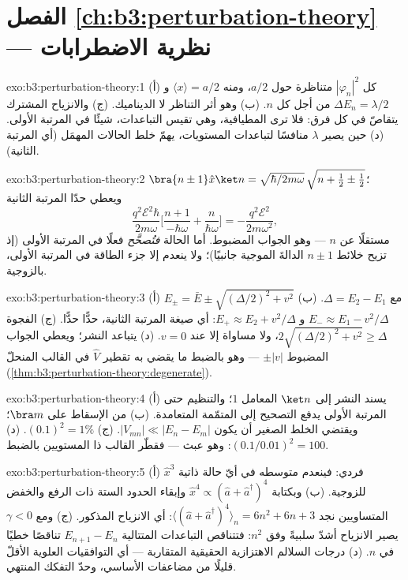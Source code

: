 \section*{الفصل \ref{ch:b3:perturbation-theory} --- نظرية الاضطرابات}

\begin{solution}{exo:b3:perturbation-theory:1}
(أ) كل $|\varphi_n|^2$ متناظرة حول $a/2$، ومنه $\langle
x\rangle = a/2$ و $\Delta E_n = \lambda/2$ من أجل كل $n$. (ب) وهو
أثر التناظر لا الديناميك. (ج) والانزياح المشترك يتقاصّ في كل
فرق: فلا ترى المطيافية، وهي تقيس التباعدات، شيئًا في
المرتبة الأولى. (د) حين يصير $\lambda$ منافسًا لتباعدات المستويات،
يهمّ خلط الحالات المهمَل (أي المرتبة الثانية).
\end{solution}

\begin{solution}{exo:b3:perturbation-theory:2}
$\bra{n\pm1}\hat x\ket n = \sqrt{\hbar/2m\omega}\,\sqrt{n + \tfrac12
\pm \tfrac12}$؛ ويعطي حدّا المرتبة الثانية
\[
\frac{q^2\mathcal E^2\hbar}{2m\omega}\Big[\frac{n+1}{-\hbar\omega}
+ \frac{n}{\hbar\omega}\Big] = -\frac{q^2\mathcal E^2}{2m\omega^2} ,
\]
مستقلًا عن $n$ --- وهو الجواب المضبوط. أما الحالة \emph{فتُصحَّح}
فعلًا في المرتبة الأولى (إذ تزيح خلائط $n \pm 1$ الدالةَ
الموجية جانبيًا)؛ ولا ينعدم إلا جزء الطاقة في المرتبة الأولى،
بالزوجية.
\end{solution}

\begin{solution}{exo:b3:perturbation-theory:3}
(أ) $E_\pm = \bar E \pm \sqrt{(\Delta/2)^2 + v^2}$ مع $\Delta =
E_2 - E_1$. (ب) $E_- \approx E_1 - v^2/\Delta$ و $E_+ \approx E_2 +
v^2/\Delta$: أي صيغة المرتبة الثانية، حدًّا حدًّا. (ج) الفجوة
$2\sqrt{(\Delta/2)^2 + v^2} \ge \Delta$، ولا مساواة إلا عند $v =
0$. (د) يتباعد النشر؛ ويعطي الجواب المضبوط $\pm|v|$ ---
وهو بالضبط ما يقضي به تقطير $\hat V$ في القالب المنحلّ
(\cref{thm:b3:perturbation-theory:degenerate}).
\end{solution}

\begin{solution}{exo:b3:perturbation-theory:4}
(أ) يسند النشر إلى $\ket n$ المعامل $1$؛ والتنظيم
حتى المرتبة الأولى يدفع التصحيح إلى المتمّمة
المتعامدة. (ب) من الإسقاط على $\bra m$؛ ويقتضي الخلط الصغير
أن يكون $|V_{mn}| \ll |E_n - E_m|$. (ج) $(0.1)^2 = 1\%$. (د)
$(0.1/0.01)^2 = 100$: وهو عبث --- فقطّر القالب ذا المستويين
بالضبط.
\end{solution}

\begin{solution}{exo:b3:perturbation-theory:5}
(أ) $\hat x^3$ فردي: فينعدم متوسطه في أيّ حالة ذاتية للزوجية.
(ب) وبكتابة $\hat x^4 \propto (\hat a + \hat
a^\dagger)^4$ وإبقاء الحدود الستة ذات الرفع والخفض
المتساويين نجد $\langle(\hat a + \hat a^\dagger)^4\rangle_n = 6n^2
+ 6n + 3$: أي الانزياح المذكور. (ج) ومع $\gamma < 0$ يصير الانزياح
أشدّ سلبيةً وفق $n^2$: فتتناقص التباعدات المتتالية $E_{n+1} - E_n$
تناقصًا خطيًا في $n$. (د) درجات السلالم الاهتزازية الحقيقية
المتقاربة --- أي التوافقيات العلوية الأقلّ قليلًا من مضاعفات
الأساسي، وحدّ التفكك المنتهي.
\end{solution}

